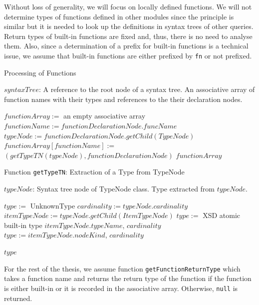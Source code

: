 Without loss of generality, we will focus on locally defined functions. We will not determine types of functions defined in other modules since the principle is similar but it is needed to look up the definitions in syntax trees of other queries. Return types of built-in functions are fixed and, thus, there is no need to analyse them. Also, since a determination of a prefix for built-in functions is a technical issue, we assume that built-in functions are either prefixed by \texttt{fn} or not prefixed.

\begin{algorithm}
\caption{Processing of Functions}
\label{ALG_processing_of_functions}
\begin{algorithmic}[1]
\REQUIRE $syntaxTree$: A reference to the root node of a syntax tree.
\ENSURE An associative array of function names with their types and references to the their declaration nodes.

\STATE $functionArray :=$ an empty associative array
    \STATE $functionName := functionDeclarationNode.funcName$
    \STATE $typeNode := functionDeclarationNode.getChild(TypeNode)$
    \STATE $functionArray[functionName] :=$ \\ $(getTypeTN(typeNode), functionDeclarationNode)$
\ENDFOR
\RETURN $functionArray$
\end{algorithmic}
\end{algorithm}

\begin{algorithm}
\caption{Function \texttt{getTypeTN}: Extraction of a Type from TypeNode}
\label{ALG_extraction_of_a_type_from_typenode}
\begin{algorithmic}[1]
\REQUIRE $typeNode$: Syntax tree node of TypeNode class.
\ENSURE Type extracted from $typeNode$.

\STATE $type :=$ UnknownType
\STATE $cardinality := typeNode.cardinality$
\STATE $itemTypeNode := typeNode.getChild(ItemTypeNode)$
    \STATE $type :=$ XSD atomic built-in type $itemTypeNode.typeName$, $cardinality$
    \STATE $type := itemTypeNode.nodeKind$, $cardinality$
\ENDIF

\RETURN $type$
\end{algorithmic}
\end{algorithm}

For the rest of the thesis, we assume function \texttt{getFunctionReturnType} which takes a function name and returns the return type of the function if the function is either built-in or it is recorded in the associative array. Otherwise, \texttt{null} is returned.

